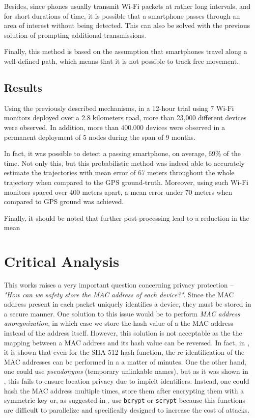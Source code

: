 \documentclass[conference]{IEEEtran}
\begin{document}
Besides, since phones usually transmit Wi-Fi packets at rather long intervals, 
and for short durations of time, it is possible that a smartphone passes 
through an area of interest without being detected. This can also be solved 
with the previous solution of prompting additional transmissions.

Finally, this method is based on the assumption that smartphones travel along a 
well defined path, which means that it is not possible to track free movement. 

\subsection{Results}

Using the previously described mechanisms, in a 12-hour trial using 7 Wi-Fi 
monitors deployed over a 2.8 kilometers road, more than 23,000 different 
devices were observed. In addition, more than 400.000 devices were observed in 
a permanent deployment of 5 nodes during the span of 9 months.

In fact, it was possible to detect a passing smartphone, on average, 69\% of 
the time. Not only this, but this probabilistic method was indeed able to 
accurately estimate the trajectories with mean error of 67 meters  throughout 
the whole trajectory when compared to the GPS ground-truth. Moreover, using 
such Wi-Fi monitors spaced over 400 meters apart, a mean error under 70 meters 
when compared to GPS ground was achieved.

Finally, it should be noted that further post-processing lead to a reduction in 
the mean 

\section{Critical Analysis} \label{sec:analysis}

This works raises a very important question concerning privacy protection -- 
\textit{"How can we safety store the MAC address of each device?"}. Since the 
MAC address present in each packet uniquely identifies a device, they must be 
stored in a secure manner. One solution to this issue would be to perform 
\textit{MAC address anonymization}, in which case we store the hash value of a 
the MAC address instead of the address itself. However, this solution is not 
acceptable as the the mapping between a MAC address and its hash value can be 
reversed. In fact, in \cite{10.1145/2611264.2611266}, it is shown that even for 
the SHA-512 hash function, the re-identification of the MAC addresses can be 
performed in a a matter of minutes. One the other hand, one could use 
\textit{pseudonyms} (temporary unlinkable names), but as it was shown in 
\cite{10.1145/1287853.1287866}, this fails to ensure location privacy due to 
impicit identifiers.  Instead, one could hash the MAC address multiple times, 
store them after encrypting them with a symmetric key or, as suggested in 
\cite{10.1145/2611264.2611266}, use \texttt{bcrypt} or \texttt{scrypt} because 
this functions are difficult to parallelize and specifically designed to 
increase the cost of attacks.
\end{document}
